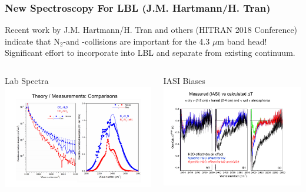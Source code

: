 \documentclass[10pt,t]{beamer}
\begin{document}
\begin{frame}
  \frametitle{New Spectroscopy For LBL (J.M. Hartmann/H. Tran)}
  \vspace{-0.1in} Recent work by J.M. Hartmann/H. Tran and others (HITRAN
  2018 Conference) indicate that N$_2$-\water and \cd-\water collisions are
  important for the 4.3 $\mu$m band head!  Significant effort to
  incorporate into LBL and separate from existing \water continuum.

  \vspace{-0.1in}
  \begin{columns}

    \begin{column}{0.55\columnwidth}
      \begin{block}{Lab Spectra}
        \includegraphics[width=\linewidth]{HartmannSlide1.png}
      \end{block}
    \end{column}

    \begin{column}{0.55\columnwidth}
      \begin{block}{IASI Biases}
        \includegraphics[width=\linewidth]{HartmannSlide2.png}
      \end{block}
    \end{column}

  \end{columns}

\end{frame}
\end{document}
